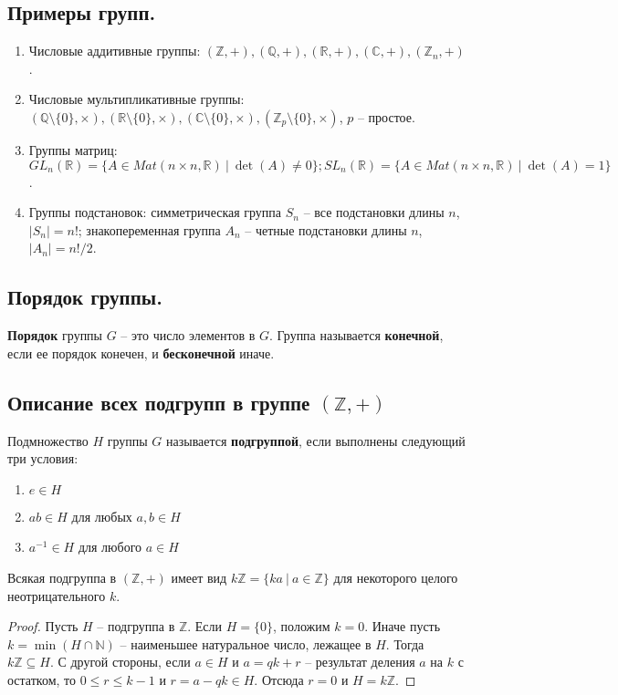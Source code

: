 \subsection{Примеры групп.}
\begin{enumerate}
    \item Числовые аддитивные группы: $(\mathbb{Z}, +), (\mathbb{Q}, +), (\mathbb{R}, +), (\mathbb{C}, +), (\mathbb{Z}_n, +)$.
    \item Числовые мультипликативные группы: $(\mathbb{Q} \setminus \{0\}, \times), (\mathbb{R} \setminus \{0\}, \times), (\mathbb{C} \setminus \{0\}, \times), (\mathbb{Z}_p \setminus \{0\}, \times)$, $p$ -- простое.
    \item Группы матриц: $GL_n(\mathbb{R}) = \{A \in Mat(n \times n, \mathbb{R}) \> | \> \det(A) \neq 0 \}; SL_n(\mathbb{R}) = \{A \in Mat(n \times n, \mathbb{R}) \> | \> \det(A) = 1 \}$.
    \item Группы подстановок: симметрическая группа $S_n$ -- все подстановки длины $n$, $|S_n| = n!$; знакопеременная группа $A_n$ -- четные подстановки длины $n$, $|A_n| = n!/2$.
\end{enumerate}

\subsection{Порядок группы.}
\begin{definition}
    \textbf{Порядок} группы $G$ -- это число элементов в $G$. Группа называется \textbf{конечной}, если ее порядок конечен, и \textbf{бесконечной} иначе.
\end{definition}


\subsection{Описание всех подгрупп в группе \texorpdfstring{$(\mathbb{Z}, +)$}.}
\begin{definition}
    Подмножество $H$ группы $G$ называется \textbf{подгруппой}, если выполнены следующий три условия:
    \begin{enumerate}
        \item $e \in H$
        \item $ab \in H$ для любых $a,b \in H$
        \item $a^{-1} \in H$ для любого $a \in H$
    \end{enumerate}
\end{definition}
\begin{statement}
    Всякая подгруппа в $(\mathbb{Z}, +)$ имеет вид $k\mathbb{Z} = \{ ka \> | \> a \in \mathbb{Z} \}$ для некоторого целого неотрицательного $k$.
    \begin{proof}
        Пусть $H$ -- подгруппа в $\mathbb{Z}$. Если $H = \{0\}$, положим $k = 0$. Иначе пусть $k = \min(H \cap \mathbb{N})$ -- наименьшее натуральное число, лежащее в $H$. Тогда $k\mathbb{Z} \subseteq H$. С другой стороны, если $a \in H$ и $a = qk + r$ -- результат деления $a$ на $k$ с остатком, то $0 \leqslant r \leqslant k - 1$ и $r = a - qk \in H$. Отсюда $r = 0$ и $H = k\mathbb{Z}$.
    \end{proof}
\end{statement}